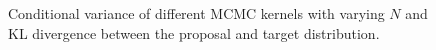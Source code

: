 \begin{figure}[H]
  \centering
  \caption{Conditional variance of different MCMC kernels with varying \(N\) and KL divergence between the proposal and target distribution.
  }\label{fig:simulations}
  \vspace{-0.1in}
\end{figure}

